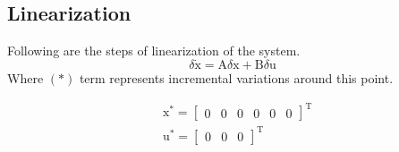 \documentclass[conference]{IEEEtran}
\begin{document}
\subsection{Linearization}
Following are the steps of linearization of the system.
\begin{equation}
	\delta \dot{\boldsymbol{\mathrm{x}}} = \boldsymbol{\mathrm{A}}\delta \boldsymbol{\mathrm{x}} + \boldsymbol{\mathrm{B}}\delta \boldsymbol{\mathrm{u}}
\end{equation}
Where $(*)$ term represents incremental variations around this point. 

\begin{equation}
	\begin{split}
		&\boldsymbol{\mathrm{x}^*} = \begin{bmatrix}
			0& 0 & 0 & 0& 0& 0
		\end{bmatrix}^\mathrm{T}\\
		&\boldsymbol{\mathrm{u}^*} = \begin{bmatrix}
			0&0&0
		\end{bmatrix}^\mathrm{T}
	\end{split}
\end{equation}

\end{document}
